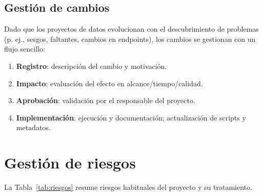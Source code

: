 \subsection{Gestión de cambios}\label{subsec:gestion-de-cambios}

Dado que los proyectos de datos evolucionan con el descubrimiento de problemas (p. ej., sesgos,
faltantes, cambios en endpoints), los cambios se gestionan con un flujo sencillo:
\begin{enumerate}
    \item \textbf{Registro}: descripción del cambio y motivación.
    \item \textbf{Impacto}: evaluación del efecto en alcance/tiempo/calidad.
    \item \textbf{Aprobación}: validación por el responsable del proyecto.
    \item \textbf{Implementación}: ejecución y documentación; actualización de scripts y metadatos.
\end{enumerate}

\section{Gestión de riesgos}\label{sec:gestion-de-riesgos}

La Tabla~\ref{tab:riesgos} resume riesgos habituales del proyecto y su tratamiento.

